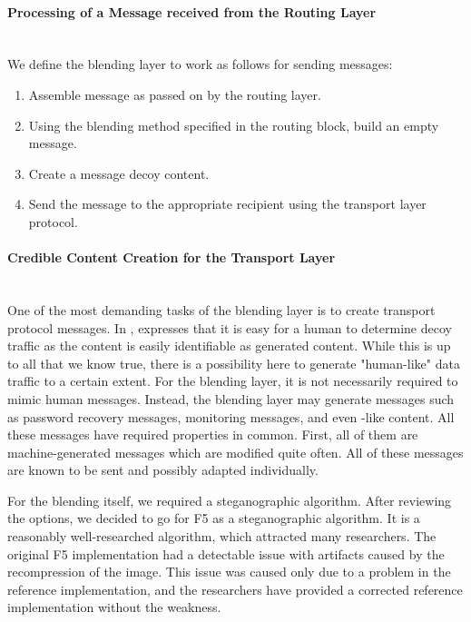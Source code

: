 \paragraph{Processing of a Message received from the Routing Layer}~\\
We define the blending layer to work as follows for sending messages:
\begin{enumerate}
	\item Assemble message as passed on by the routing layer.
	\item Using the blending method specified in the routing block, build an empty message. 
	\item Create a message decoy content.
	\item Send the message to the appropriate recipient using the transport layer protocol.
\end{enumerate}

\paragraph{Credible Content Creation for the Transport Layer}~\\
One of the most demanding tasks of the blending layer is to create transport protocol messages. In \cite{oakland2013-parrot}, \citeauthor{oakland2013-parrot} expresses that it is easy for a human to determine decoy traffic as the content is easily identifiable as generated content. While this is up to all that we know true, there is a possibility here to generate "human-like" data traffic to a certain extent. For the blending layer, it is not necessarily required to mimic human messages. Instead, the blending layer may generate messages such as password recovery messages, monitoring messages, and even -like content. All these messages have required properties in common. First, all of them are machine-generated messages which are modified quite often. All of these messages are known to be sent and possibly adapted individually. 

For the blending itself, we required a steganographic algorithm. After reviewing the options, we decided to go for F5\cite{f5} as a steganographic algorithm. It is a reasonably well-researched algorithm, which attracted many researchers. The original F5 implementation had a detectable issue with artifacts\cite{F5broken} caused by the recompression of the image. This issue was caused only due to a problem in the reference implementation, and the researchers have provided a corrected reference implementation without the weakness.

